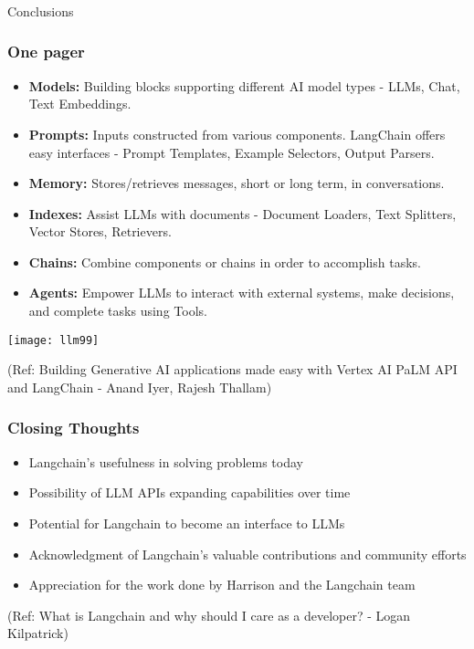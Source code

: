 \begin{frame}[fragile]\frametitle{}
\begin{center}
{\Large Conclusions}
\end{center}
\end{frame}

\begin{frame}[fragile]\frametitle{One pager}

\begin{itemize}
\item \textbf{Models:} Building blocks supporting different AI model types - LLMs, Chat, Text Embeddings.
\item \textbf{Prompts:} Inputs constructed from various components. LangChain offers easy interfaces - Prompt Templates, Example Selectors, Output Parsers.
\item \textbf{Memory:} Stores/retrieves messages, short or long term, in conversations.
\item \textbf{Indexes:} Assist LLMs with documents - Document Loaders, Text Splitters, Vector Stores, Retrievers.
\item \textbf{Chains:} Combine components or chains in order to accomplish tasks.
\item \textbf{Agents:} Empower LLMs to interact with external systems, make decisions, and complete tasks using Tools.
\end{itemize}

\begin{center}
\texttt{[image: llm99]}
\end{center}


{\tiny (Ref: Building Generative AI applications made easy with Vertex AI PaLM API and LangChain  - Anand Iyer, Rajesh Thallam)}

\end{frame}


\begin{frame}[fragile]\frametitle{Closing Thoughts}

\begin{itemize}
\item Langchain's usefulness in solving problems today
\item Possibility of LLM APIs expanding capabilities over time
\item Potential for Langchain to become an interface to LLMs
\item Acknowledgment of Langchain's valuable contributions and community efforts
\item Appreciation for the work done by Harrison and the Langchain team
\end{itemize}

{\tiny (Ref: What is Langchain and why should I care as a developer? - Logan Kilpatrick)}

\end{frame}

